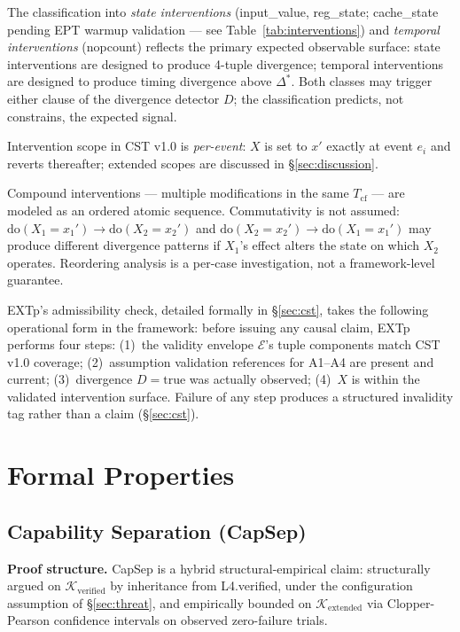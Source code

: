\documentclass[conference]{IEEEtran}
\newcommand{\Tcf}{T_\text{cf}}
\newcommand{\Kverified}{\mathcal{K}_\text{verified}}
\newcommand{\Kextended}{\mathcal{K}_\text{extended}}
\newcommand{\Dstar}{\Delta^{*}}
\begin{document}
The classification into \emph{state interventions} (input\_value,
reg\_state; cache\_state pending EPT warmup validation --- see
Table~\ref{tab:interventions}) and \emph{temporal interventions}
(nopcount) reflects the primary expected observable surface: state
interventions are designed to produce 4-tuple divergence; temporal
interventions are designed to produce timing divergence above
$\Dstar$. Both classes may trigger either clause of the divergence
detector $D$; the classification predicts, not constrains, the
expected signal.

Intervention scope in CST v1.0 is \emph{per-event}: $X$ is set to
$x'$ exactly at event $e_i$ and reverts thereafter; extended scopes
are discussed in \S\ref{sec:discussion}.

Compound interventions --- multiple modifications in the same $\Tcf$
--- are modeled as an ordered atomic sequence. Commutativity is not
assumed: $\text{do}(X_1{=}x_1') \rightarrow \text{do}(X_2{=}x_2')$
and $\text{do}(X_2{=}x_2') \rightarrow \text{do}(X_1{=}x_1')$ may
produce different divergence patterns if $X_1$'s effect alters the
state on which $X_2$ operates. Reordering analysis is a per-case
investigation, not a framework-level guarantee.

EXTp's admissibility check, detailed formally in
\S\ref{sec:cst}, takes the following operational form in the
framework: before issuing any causal claim, EXTp performs four
steps: (1)~the validity envelope $\mathcal{E}$'s tuple components
match CST v1.0 coverage; (2)~assumption validation references for
A1--A4 are present and current; (3)~divergence $D{=}\text{true}$ was
actually observed; (4)~$X$ is within the validated intervention
surface. Failure of any step produces a structured invalidity tag
rather than a claim (\S\ref{sec:cst}).

\section{Formal Properties}\label{sec:properties}

\subsection{Capability Separation (CapSep)}\label{sec:capsep}

\textbf{Proof structure.} CapSep is a hybrid structural-empirical
claim: structurally argued on $\Kverified$ by inheritance from
L4.verified, under the configuration assumption of
\S\ref{sec:threat}, and empirically bounded on $\Kextended$ via
Clopper-Pearson confidence intervals on observed zero-failure trials.
\end{document}
